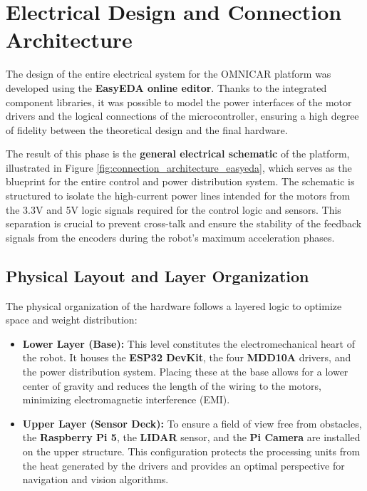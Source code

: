 \section{Electrical Design and Connection Architecture}

The design of the entire electrical system for the OMNICAR platform was developed using the \textbf{EasyEDA online editor}. Thanks to the integrated component libraries, it was possible to model the power interfaces of the motor drivers and the logical connections of the microcontroller, ensuring a high degree of fidelity between the theoretical design and the final hardware.

The result of this phase is the \textbf{general electrical schematic} of the platform, illustrated in Figure \ref{fig:connection_architecture_easyeda}, which serves as the blueprint for the entire control and power distribution system. The schematic is structured to isolate the high-current power lines intended for the motors from the 3.3V and 5V logic signals required for the control logic and sensors. This separation is crucial to prevent cross-talk and ensure the stability of the feedback signals from the encoders during the robot's maximum acceleration phases.

\subsection{Physical Layout and Layer Organization}

The physical organization of the hardware follows a layered logic to optimize space and weight distribution:

\begin{itemize}
    \item \textbf{Lower Layer (Base):} This level constitutes the electromechanical heart of the robot. It houses the \textbf{ESP32 DevKit}, the four \textbf{MDD10A} drivers, and the power distribution system. Placing these at the base allows for a lower center of gravity and reduces the length of the wiring to the motors, minimizing electromagnetic interference (EMI).
    \item \textbf{Upper Layer (Sensor Deck):} To ensure a field of view free from obstacles, the \textbf{Raspberry Pi 5}, the \textbf{LIDAR} sensor, and the \textbf{Pi Camera} are installed on the upper structure. This configuration protects the processing units from the heat generated by the drivers and provides an optimal perspective for navigation and vision algorithms.
\end{itemize}

